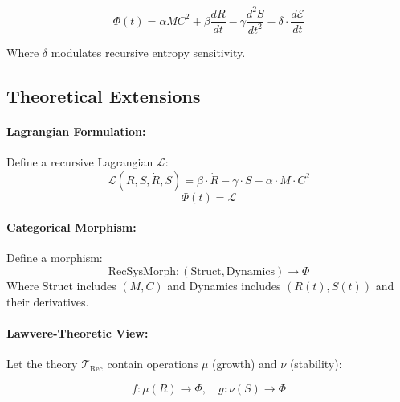 \documentclass[12pt]{article}
\begin{document}
\begin{equation}
\Phi(t) = \alpha M C^2 + \beta \frac{dR}{dt} - \gamma \frac{d^2S}{dt^2} - \delta \cdot \frac{d\mathcal{E}}{dt}
\end{equation}

Where $\delta$ modulates recursive entropy sensitivity.

\subsection*{Theoretical Extensions}

\paragraph{Lagrangian Formulation:}
Define a recursive Lagrangian $\mathcal{L}$:
\[
\mathcal{L}(R, S, \dot{R}, \ddot{S}) = \beta \cdot \dot{R} - \gamma \cdot \ddot{S} - \alpha \cdot M \cdot C^2
\]
\[
\Phi(t) = \mathcal{L}
\]

\paragraph{Categorical Morphism:}
Define a morphism:
\[
\text{RecSysMorph} : (\text{Struct}, \text{Dynamics}) \rightarrow \Phi
\]
Where Struct includes $(M, C)$ and Dynamics includes $(R(t), S(t))$ and their derivatives.

\paragraph{Lawvere-Theoretic View:}
Let the theory $\mathcal{T}_{\text{Rec}}$ contain operations $\mu$ (growth) and $\nu$ (stability):

\[
f : \mu(R) \rightarrow \Phi, \quad g : \nu(S) \rightarrow \Phi
\]
\end{document}
